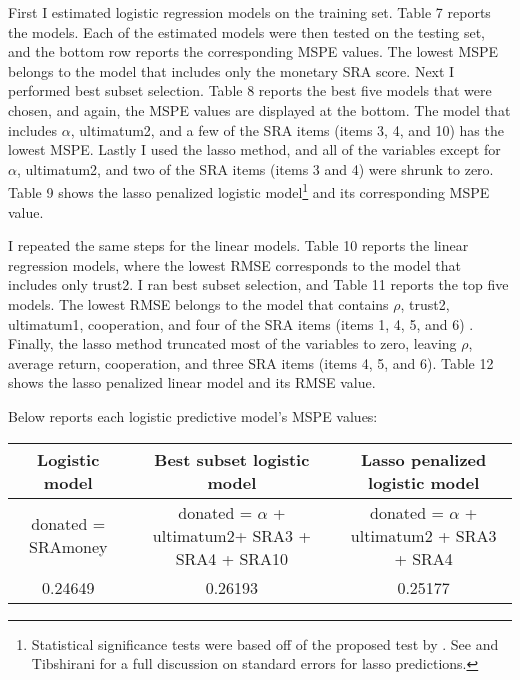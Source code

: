 \documentclass[12pt]{article}
\begin{document}
First I estimated logistic regression models on the training set. Table 7 reports the models. Each of the estimated models were then tested on the testing set, and the bottom row reports the corresponding MSPE values. The lowest MSPE belongs to the model that includes only the monetary SRA score. Next I performed best subset selection. Table 8 reports the best five models that were chosen, and again, the MSPE values are displayed at the bottom. The model that includes \(\alpha\), ultimatum2, and a few of the SRA items (items 3, 4, and 10) has the lowest MSPE. Lastly I used the lasso method, and all of the variables except for \(\alpha\), ultimatum2, and two of the SRA items (items 3 and 4) were shrunk to zero. Table 9 shows the lasso penalized logistic model\footnote{Statistical significance tests were based off of the proposed test by \cite{lockhart_2014}. See \cite{kyung_2010} and Tibshirani for a full discussion on standard errors for lasso predictions.} and its corresponding MSPE value.

I repeated the same steps for the linear models. Table 10 reports the linear regression models, where the lowest RMSE corresponds to the model that includes only trust2. I ran best subset selection, and Table 11 reports the top five models. The lowest RMSE belongs to the model that contains \(\rho\), trust2, ultimatum1, cooperation, and four of the SRA items (items 1, 4, 5, and 6) . Finally, the lasso method truncated most of the variables to zero, leaving \(\rho\), average return, cooperation, and three SRA items (items 4, 5, and 6). Table 12 shows the lasso penalized linear model and its RMSE value.

Below reports each logistic predictive model\rq s MSPE values:

\begin{center}
\begin{adjustbox}{width=\textwidth}
\begin{tabular}{ c | c | c }
\hline \hline
Logistic model & Best subset logistic model & Lasso penalized logistic model \\ 
\hline
\small donated = SRAmoney & donated = \(\alpha\) + ultimatum2+ SRA3 + SRA4 + SRA10 & donated = \(\alpha\) + ultimatum2 + SRA3 + SRA4 \\
 \hline
 0.24649 & 0.26193 & 0.25177 \\  
 \hline \hline
\end{tabular}
\end{adjustbox}
\end{center}
 
\end{document}
